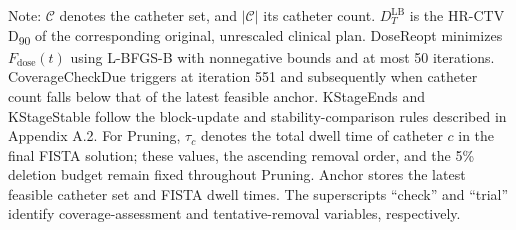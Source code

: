 \documentclass[12pt,twoside,letterpaper]{article}
\makeatletter
\newcommand{\compactformat}{\setstretch{1}\fontsize{8}{9.6}\selectfont}
\newcounter{algorithm}
\newenvironment{algorithmblock}{%
  \begin{table}[H]\begin{minipage}{\linewidth}%
  \compactformat\let\footnotesize\compactformat
  \def\@captype{algorithm}%
}{\end{minipage}\end{table}}
\makeatother
\begin{document}
\begin{algorithmblock}
\noindent Note: $\mathcal{C}$ denotes the catheter set, and $\left| \mathcal{C} \right|$ its catheter count. $D_{T}^{\text{LB}}$ is the HR-CTV D\textsubscript{90} of the corresponding original, unrescaled clinical plan. DoseReopt minimizes $F_{\text{dose}}\left( t \right)$ using L-BFGS-B with nonnegative bounds and at most 50 iterations. CoverageCheckDue triggers at iteration 551 and subsequently when catheter count falls below that of the latest feasible anchor. KStageEnds and KStageStable follow the block-update and stability-comparison rules described in Appendix A.2. For Pruning, $\tau_{c}$ denotes the total dwell time of catheter $c$ in the final FISTA solution; these values, the ascending removal order, and the 5\% deletion budget remain fixed throughout Pruning. Anchor stores the latest feasible catheter set and FISTA dwell times. The superscripts ``check'' and ``trial'' identify coverage-assessment and tentative-removal variables, respectively.\par
\end{algorithmblock}
\end{document}
